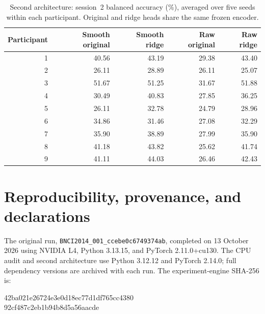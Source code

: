 \documentclass[11pt,a4paper]{article}
\begin{document}
\begin{table}[h]
\centering\small
\caption{Second architecture: session~2 balanced accuracy (\%), averaged over five
seeds within each participant. Original and ridge heads share the same frozen encoder.}
\begin{tabular}{r r r r r}
\toprule
Participant & Smooth original & Smooth ridge & Raw original & Raw ridge \\
\midrule
1 & 40.56 & 43.19 & 29.38 & 43.40 \\
2 & 26.11 & 28.89 & 26.11 & 25.07 \\
3 & 51.67 & 51.25 & 31.67 & 51.88 \\
4 & 30.49 & 40.83 & 27.85 & 36.25 \\
5 & 26.11 & 32.78 & 24.79 & 28.96 \\
6 & 34.86 & 31.46 & 27.08 & 32.29 \\
7 & 35.90 & 38.89 & 27.99 & 35.90 \\
8 & 41.18 & 43.82 & 25.62 & 41.74 \\
9 & 41.11 & 44.03 & 26.46 & 42.43 \\
\bottomrule
\end{tabular}
\end{table}

\clearpage
\section{Reproducibility, provenance, and declarations}

The original run, \texttt{BNCI2014\_001\_ccebe0c6749374ab}, completed on
13 October 2026 using NVIDIA L4, Python 3.13.15, and PyTorch 2.11.0+cu130.
The CPU audit and second architecture use Python 3.12.12 and PyTorch 2.14.0;
full dependency versions are archived with each run.
The experiment-engine SHA-256 is:
\begin{center}\small\ttfamily
42ba021e26724e3e0d18ec77d1df765cc4380\\
92cf487c2eb1b94b8d5a56aacde
\end{center}
\end{document}
